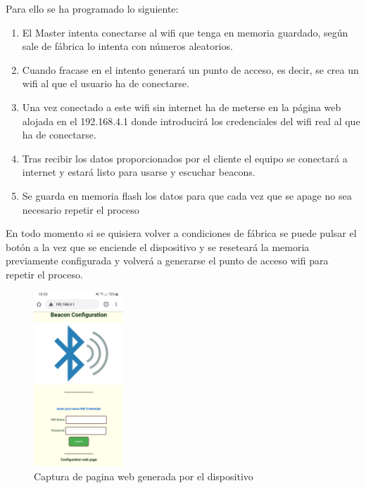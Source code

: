 \documentclass[a4paper ,12pt, onecolumn]{article}
\begin{document}
            Para ello se ha programado lo siguiente:
            \begin{enumerate}
                \item El Master intenta conectarse al wifi que tenga en memoria guardado, según sale de fábrica lo intenta con números aleatorios.
                \item Cuando fracase en el intento generará un punto de acceso, es decir, se crea un wifi al que el usuario ha de conectarse.
                \item Una vez conectado a este wifi sin internet ha de meterse en la página web alojada en el 192.168.4.1 donde introducirá los credenciales 
                del wifi real al que ha de conectarse.
                \item Tras recibir los datos proporcionados por el cliente el equipo se conectará a internet y estará listo para usarse y escuchar beacons.
                \item Se guarda en memoria flash los datos para que cada vez que se apage no sea necesario repetir el proceso
            \end{enumerate}
            En todo momento si se quisiera volver a condiciones de fábrica se puede pulsar el botón a la vez que se enciende el dispositivo y se reseteará 
            la memoria previamente configurada y volverá a generarse el punto de acceso wifi para repetir el proceso.
            \begin{center}
                \begin{figure}[]
                    \centering
                    \includegraphics[width=0.3\textwidth]{../../Memmory/images/AP_wifi_config.jpeg}
                    \caption{Captura de pagina web generada por el dispositivo}
                    \label{fig:mesh11}
                \end{figure}
            \end{center}
\end{document}
